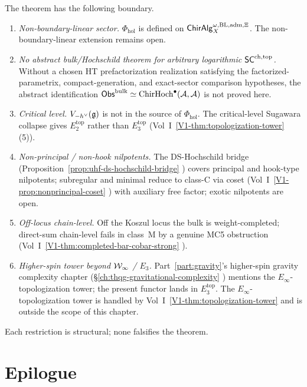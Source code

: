 The theorem has the following boundary.
\begin{enumerate}
\item \emph{Non-boundary-linear sector.}
 $\Phi_{\mathrm{hol}}$ is defined on
 $\mathsf{ChirAlg}^{\omega,\mathrm{BL,adm},\Xi}_X$. The non-boundary-linear
	 extension remains open.
\item \emph{No abstract bulk/Hochschild theorem for arbitrary
 logarithmic $\mathsf{SC}^{\mathrm{ch},\mathrm{top}}$.}
 Without a chosen HT prefactorization realization satisfying the
 factorized-parametrix, compact-generation, and exact-sector
 comparison hypotheses, the abstract identification
 $\mathsf{Obs}^{\mathrm{bulk}}\simeq\mathrm{ChirHoch}^\bullet(\mathcal{A},\mathcal{A})$ is not
 proved here.
\item \emph{Critical level.} $V_{-h^\vee}(\mathfrak{g})$ is not in the
 source of $\Phi_{\mathrm{hol}}$. The critical-level Sugawara
 collapse gives $E_2^{\mathrm{top}}$ rather than
 $E_3^{\mathrm{top}}$
 \textup{(}Vol~I~\ref*{V1-thm:topologization-tower}%
 \textup{(5)}\textup{)}.
\item \emph{Non-principal / non-hook nilpotents.} The
 DS-Hochschild bridge
 \textup{(}Proposition~\ref{prop:uhf-ds-hochschild-bridge}%
 \textup{)} covers principal and hook-type nilpotents; subregular
 and minimal reduce to class-C via coset
 \textup{(}Vol~I~\ref*{V1-prop:nonprincipal-coset}%
 \textup{)} with auxiliary free factor; exotic nilpotents are
 open.
\item \emph{Off-locus chain-level.} Off the Koszul locus the
 bulk is weight-completed; direct-sum chain-level fails in
 class~M by a genuine MC5 obstruction
 \textup{(}Vol~I~\ref*{V1-thm:completed-bar-cobar-strong}%
 \textup{)}.
\item \emph{Higher-spin tower beyond $\mathcal{W}_\infty$ / $E_3$.}
 Part~\ref*{part:gravity}'s higher-spin gravity complexity chapter
 \textup{(}\S\ref*{ch:thqg-gravitational-complexity}%
 \textup{)} mentions the $E_\infty$-topologization tower;
 the present functor lands in $E_3^{\mathrm{top}}$. The
 $E_\infty$-topologization tower is handled by
 Vol~I~\ref*{V1-thm:topologization-tower} and is
 outside the scope of this chapter.
\end{enumerate}

Each restriction is structural; none falsifies the theorem.

\section*{Epilogue}

